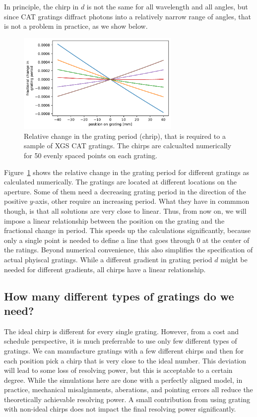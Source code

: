 \documentclass[]{spie}  %
\begin{document}
In principle, the chirp in $d$ is not the same for all wavelength and all angles, but since CAT gratings diffract photons into a relatively narrow range of angles, that is not a problem in practice, as we show below.

\begin{figure} [ht]
\begin{center}
\includegraphics[width=0.7\textwidth]{chirps}
\end{center}
\caption {\label{fig:chirps}
Relative change in the grating period (chrip), that is required to a sample of XGS CAT gratings. The chirps are calcualted numerically for 50 evenly spaced points on each grating.
}
\end{figure}


Figure~\ref{fig:chirps} shows the relative change in the grating period for different gratings as calculated numerically. The gratings are located at different locations on the aperture. Some of them need a decreasing grating period in the direction of the positive $y$-axis, other require an increasing period. What they have in commmon though, is that all solutions are very close to linear. Thus, from now on, we will impose a linear relationship between the position on the grating and the fractional change in period. This speeds up the calculations significantly, because only a single point is needed to define a line that goes through 0 at the center of the ratings. Beyond numerical convenience, this also simplifies the specification of actual phyiscal gratings. While a different gradient in grating period $d$ might be needed for different gradients, all chirps have a linear relationship.


\subsection{How many different types of gratings do we need?}

The ideal chirp is different for every single grating. However, from a cost and schedule perspective, it is much preferrable to use only few different types of gratings. We can manufacture gratings with a few different chirps and then for each position pick a chirp that is very close to the ideal number. This deviation will lead to some loss of resolving power, but this is acceptable to a certain degree. While the simulations here are done with a perfectly aligned model, in practice, mechanical misalginments, aberations, and pointing errors all reduce the theoretically achievable resolving power. A small contribution from using grating with non-ideal chirps does not impact the final resolving power significantly.
\end{document}
